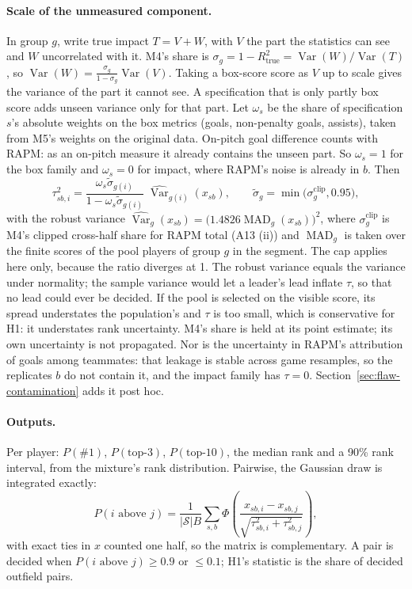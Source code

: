 \documentclass[11pt,a4paper]{article}
\DeclareMathOperator{\Var}{Var}
\DeclareMathOperator{\MAD}{MAD}
\begin{document}
\paragraph{Scale of the unmeasured component.}
In group $g$, write true impact $T = V + W$, with $V$ the part the statistics can
see and $W$ uncorrelated with it. M4's share is
$\sigma_g = 1 - R^2_{\text{true}} = \Var(W)/\Var(T)$, so
$\Var(W) = \frac{\sigma_g}{1 - \sigma_g}\Var(V)$. Taking a box-score score as $V$
up to scale gives the variance of the part it cannot see. A specification that
is only partly box score adds unseen variance only for that part. Let
$\omega_s$ be the share of specification $s$'s absolute weights on the box
metrics (goals, non-penalty goals, assists), taken from M5's weights on the
original data. On-pitch goal difference counts with RAPM: as an on-pitch measure
it already contains the unseen part. So $\omega_s = 1$ for the box family and
$\omega_s = 0$ for impact, where RAPM's noise is already in $b$. Then
\begin{equation}
  \tau^2_{sb,i} = \frac{\omega_s \tilde\sigma_{g(i)}}{1 - \omega_s \tilde\sigma_{g(i)}}\;
  \widehat{\Var}_{g(i)}(x_{sb}),
  \qquad
  \tilde\sigma_g = \min\big(\sigma^{\text{clip}}_g, 0.95\big),
  \label{eq:tau}
\end{equation}
with the robust variance
$\widehat{\Var}_g(x_{sb}) = \big(1.4826 \MAD_g(x_{sb})\big)^2$,
where $\sigma^{\text{clip}}_g$ is M4's clipped cross-half share for RAPM total
(A13 (ii)) and $\MAD_g$ is taken over the finite scores of the pool players of
group $g$ in the segment. The cap applies here only, because the ratio diverges
at 1. The robust variance equals the variance under normality; the sample
variance would let a leader's lead inflate $\tau$, so that no lead could ever be
decided. If the pool is selected on the visible score, its spread understates
the population's and $\tau$ is too small, which is conservative for H1: it
understates rank uncertainty. M4's share is held at its point estimate; its
own uncertainty is not propagated. Nor is the uncertainty in RAPM's
attribution of goals among teammates: that leakage is stable across game
resamples, so the replicates $b$ do not contain it, and the impact family has
$\tau = 0$. Section~\ref{sec:flaw-contamination} adds it post hoc.

\paragraph{Outputs.}
Per player: $P(\#1)$, $P(\text{top-3})$, $P(\text{top-10})$, the median rank and a
90\% rank interval, from the mixture's rank distribution. Pairwise, the Gaussian
draw is integrated exactly:
\begin{equation}
  P(i \text{ above } j) = \frac{1}{|\mathcal S| B}\sum_{s, b}
  \Phi\!\left(\frac{x_{sb,i} - x_{sb,j}}{\sqrt{\tau^2_{sb,i} + \tau^2_{sb,j}}}\right),
  \label{eq:pairwise}
\end{equation}
with exact ties in $x$ counted one half, so the matrix is complementary. A pair is
decided when $P(i \text{ above } j) \ge 0.9$ or $\le 0.1$; H1's statistic is the
share of decided outfield pairs.
\end{document}
